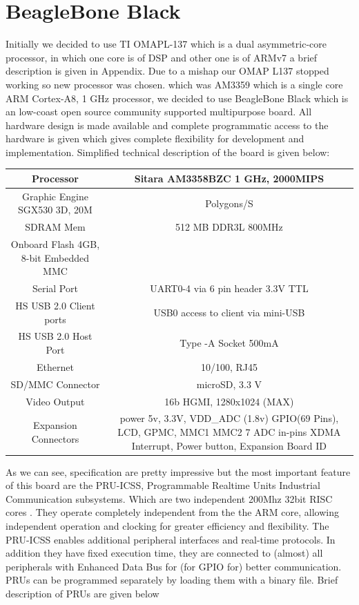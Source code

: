 \section{BeagleBone Black}
Initially we decided to use TI OMAPL-137 which is a dual asymmetric-core processor, in which one core is of DSP and other one is of ARMv7 a brief description is given in Appendix. Due to a mishap our OMAP L137 stopped working so new processor was chosen. which was AM3359 which is a single core ARM Cortex-A8, 1 GHz processor, we decided to use BeagleBone Black which is an low-coast open source community supported multipurpose board. All hardware design is made available and complete programmatic access to the hardware is given which gives complete flexibility for development and implementation. Simplified technical description of the board is given below:
\begin{table}[h]
		\begin{center}
			\setlength\arrayrulewidth{1pt}
			\begin{tabular}{|c|c|}
				\hline
				Processor & Sitara AM3358BZC 1 GHz, 2000MIPS\\
				\hline
				Graphic Engine  SGX530 3D, 20M & Polygons/S\\
				\hline
				SDRAM Mem & 512 MB DDR3L 800MHz \\
				\hline
				Onboard Flash 4GB, 8-bit Embedded MMC \\
				\hline
				Serial Port & UART0-4 via 6 pin header 3.3V TTL\\ 
				\hline
				HS USB 2.0 Client ports & USB0 access to client via mini-USB\\
				\hline
				HS USB 2.0 Host Port & Type -A Socket 500mA \\
				\hline
				Ethernet & 10/100, RJ45 \\
				\hline
				SD/MMC Connector & microSD, 3.3 V\\
				\hline
				Video Output & 16b HGMI, 1280x1024 (MAX)\\
				\hline 
				\multirow{3}{10pt}{Expansion Connectors} & power 5v, 3.3V, VDD\_ADC (1.8v) GPIO(69 Pins), LCD, GPMC, MMC1 MMC2 7 ADC in-pins	XDMA Interrupt,
				Power button, Expansion Board ID\\
				\hline
				
			\end{tabular}
		\end{center}
\end{table}

As we can see, specification are pretty impressive but the most important feature of this board are the PRU-ICSS, Programmable Realtime Units Industrial Communication subsystems. Which are two independent 200Mhz 32bit RISC cores . They operate completely independent from the the ARM core,  allowing independent operation and clocking for greater efficiency and flexibility. The PRU-ICSS enables additional peripheral interfaces and real-time protocols. In addition they have fixed execution time, they are connected to (almost) all peripherals with Enhanced Data Bus for (for GPIO for) better communication. PRUs can be programmed separately by loading them with a binary file. Brief description of PRUs are given below

